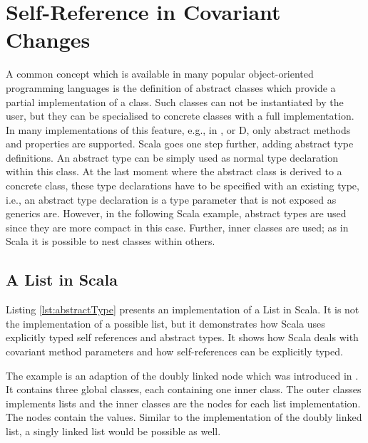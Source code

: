 \section{Self-Reference in Covariant Changes}
A common concept which is available in many popular object-oriented
programming languages is the definition of abstract classes which provide
a partial implementation of a class. Such classes can not be instantiated
by the user, but they can be specialised to concrete classes with a full
implementation. In many implementations of this feature, e.g., in \cpp,
\cs or D, only abstract methods and properties are supported. Scala
goes one step further, adding abstract type definitions. An abstract
type can be simply used as normal type declaration within this class. At
the last moment where the abstract class is derived to a concrete class,
these type declarations have to be specified with an existing type, i.e.,
an abstract type declaration is a type parameter that is not exposed
as generics are. However, in the following Scala example, abstract
types are used since they are more compact in this case. Further, inner
classes are used; as in Scala it is possible to nest classes within others.

\subsection{A List in Scala}
Listing \ref{lst:abstractType} presents an implementation of a List
in Scala. It is not the implementation of a possible list, but it
demonstrates how Scala uses explicitly typed self references and abstract
types. It shows how Scala deals with covariant method parameters and
how self-references can be explicitly typed.

The example is an adaption of the doubly linked node which was
introduced in . It contains three global classes,
each containing one inner class. The outer classes implements lists and
the inner classes are the nodes for each list implementation. The nodes
contain the values.  Similar to the implementation of the doubly linked
list, a singly linked list would be possible as well.

